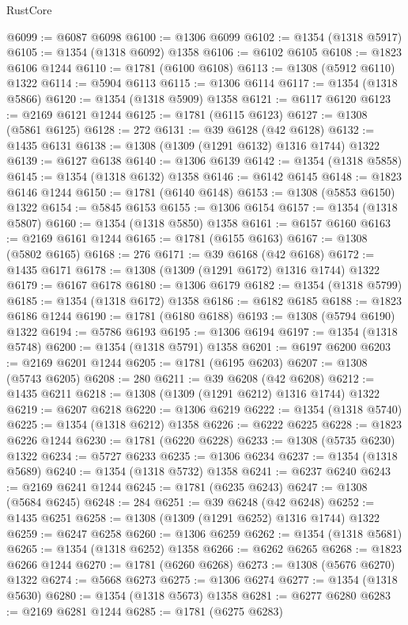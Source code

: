 \begin{lexlean}{RustCore}
\begin{coremodule}
@6099 := @6087 @6098
@6100 := @1306 @6099
@6102 := @1354 (@1318 @5917)
@6105 := @1354 (@1318 @6092) @1358
@6106 := @6102 @6105
@6108 := @1823 @6106 @1244
@6110 := @1781 (@6100 @6108)
@6113 := @1308 (@5912 @6110) @1322
@6114 := @5904 @6113
@6115 := @1306 @6114
@6117 := @1354 (@1318 @5866)
@6120 := @1354 (@1318 @5909) @1358
@6121 := @6117 @6120
@6123 := @2169 @6121 @1244
@6125 := @1781 (@6115 @6123)
@6127 := @1308 (@5861 @6125)
@6128 := 272
@6131 := @39 @6128 (@42 @6128)
@6132 := @1435 @6131
@6138 := @1308 (@1309 (@1291 @6132) @1316 @1744) @1322
@6139 := @6127 @6138
@6140 := @1306 @6139
@6142 := @1354 (@1318 @5858)
@6145 := @1354 (@1318 @6132) @1358
@6146 := @6142 @6145
@6148 := @1823 @6146 @1244
@6150 := @1781 (@6140 @6148)
@6153 := @1308 (@5853 @6150) @1322
@6154 := @5845 @6153
@6155 := @1306 @6154
@6157 := @1354 (@1318 @5807)
@6160 := @1354 (@1318 @5850) @1358
@6161 := @6157 @6160
@6163 := @2169 @6161 @1244
@6165 := @1781 (@6155 @6163)
@6167 := @1308 (@5802 @6165)
@6168 := 276
@6171 := @39 @6168 (@42 @6168)
@6172 := @1435 @6171
@6178 := @1308 (@1309 (@1291 @6172) @1316 @1744) @1322
@6179 := @6167 @6178
@6180 := @1306 @6179
@6182 := @1354 (@1318 @5799)
@6185 := @1354 (@1318 @6172) @1358
@6186 := @6182 @6185
@6188 := @1823 @6186 @1244
@6190 := @1781 (@6180 @6188)
@6193 := @1308 (@5794 @6190) @1322
@6194 := @5786 @6193
@6195 := @1306 @6194
@6197 := @1354 (@1318 @5748)
@6200 := @1354 (@1318 @5791) @1358
@6201 := @6197 @6200
@6203 := @2169 @6201 @1244
@6205 := @1781 (@6195 @6203)
@6207 := @1308 (@5743 @6205)
@6208 := 280
@6211 := @39 @6208 (@42 @6208)
@6212 := @1435 @6211
@6218 := @1308 (@1309 (@1291 @6212) @1316 @1744) @1322
@6219 := @6207 @6218
@6220 := @1306 @6219
@6222 := @1354 (@1318 @5740)
@6225 := @1354 (@1318 @6212) @1358
@6226 := @6222 @6225
@6228 := @1823 @6226 @1244
@6230 := @1781 (@6220 @6228)
@6233 := @1308 (@5735 @6230) @1322
@6234 := @5727 @6233
@6235 := @1306 @6234
@6237 := @1354 (@1318 @5689)
@6240 := @1354 (@1318 @5732) @1358
@6241 := @6237 @6240
@6243 := @2169 @6241 @1244
@6245 := @1781 (@6235 @6243)
@6247 := @1308 (@5684 @6245)
@6248 := 284
@6251 := @39 @6248 (@42 @6248)
@6252 := @1435 @6251
@6258 := @1308 (@1309 (@1291 @6252) @1316 @1744) @1322
@6259 := @6247 @6258
@6260 := @1306 @6259
@6262 := @1354 (@1318 @5681)
@6265 := @1354 (@1318 @6252) @1358
@6266 := @6262 @6265
@6268 := @1823 @6266 @1244
@6270 := @1781 (@6260 @6268)
@6273 := @1308 (@5676 @6270) @1322
@6274 := @5668 @6273
@6275 := @1306 @6274
@6277 := @1354 (@1318 @5630)
@6280 := @1354 (@1318 @5673) @1358
@6281 := @6277 @6280
@6283 := @2169 @6281 @1244
@6285 := @1781 (@6275 @6283)

\end{coremodule}
\end{lexlean}
